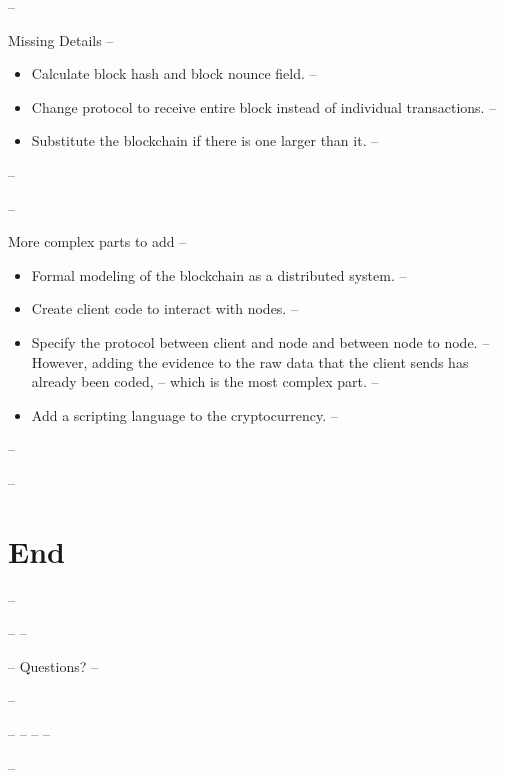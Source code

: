 \documentclass{beamer}
\begin{document}
-- \begin{frame}{Missing Details}
--   \begin{itemize}[<+->]
--     \item Calculate block hash and block nounce field.
--     \item Change protocol to receive entire block instead of individual transactions.
--     \item Substitute the blockchain if there is one larger than it.
--   \end{itemize}
-- \end{frame}

-- \begin{frame}{More complex parts to add}
--   \begin{itemize}[<+->]
--     \item Formal modeling of the blockchain as a distributed system.
--     \item Create client code to interact with nodes.
--     \item Specify the protocol between client and node and between node to node.
--           However, adding the evidence to the raw data that the client sends has already been coded,
--           which is the most complex part.
--     \item Add a scripting language to the cryptocurrency.
--   \end{itemize}
-- \end{frame}

-- \section{End}

-- \begin{frame}
--   \vspace*{36 pt}
--   \begin{center}
--   {\Huge Questions?}
--   \end{center}
-- \end{frame}

-- %
-- %
-- %
-- %

-- 
\end{document}
